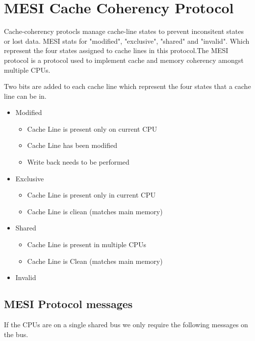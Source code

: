 \documentclass{article}
\begin{document}
\section{MESI Cache Coherency Protocol}

Cache-coherency protocls manage cache-line states to prevent
inconsitent states or lost data. MESI stats for "modified",
"exclusive", "shared" and "invalid". Which represent the four states
assigned to cache lines in this protocol.The MESI protocol is a
protocol used to implement cache and memory coherency amongst multiple
CPUs. \cite{Birdetal2001}

Two bits are added to each cache line which represent the four states
that a cache line can be in.

\begin{itemize}
\item Modified
  \begin{itemize}
    \item Cache Line is present only on current CPU
    \item Cache Line has been modified
    \item Write back needs to be performed
  \end{itemize}


\item Exclusive
    \begin{itemize}
    \item Cache Line is present only in current CPU
    \item Cache Line is cliean (matches main memory)
    \end{itemize}
    
  \item Shared
    \begin{itemize}
    \item Cache Line is present in multiple CPUs
    \item Cache Line is Clean (matches main memory)
    \end{itemize}
  \item Invalid 
\end{itemize}

\subsection{MESI Protocol messages}

If the CPUs are on a single shared bus we only require the following
messages on the bus.
\end{document}
